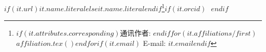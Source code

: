 $if(it.url)$\href{$it.url$}{$it.name.literal$}$else$$it.name.literal$$endif$\footnote{$if(it.attributes.corresponding)$通讯作者: $endif$$for(it.affiliations/first)$$affiliation.tex()$$endfor$$if(it.email)$ E-mail: \texttt{$it.email$}$endif$}$if(it.orcid)$\,~$endif$